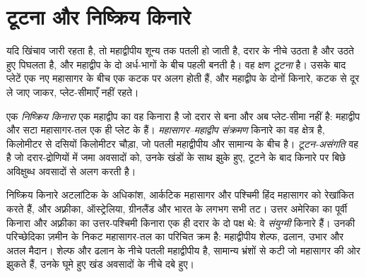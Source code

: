 \section{टूटना और निष्क्रिय किनारे}

यदि खिंचाव जारी रहता है, तो महाद्वीपीय  शून्य तक पतली हो जाती है, दरार के नीचे  उठता है और उठते हुए पिघलता है, और महाद्वीप के दो अर्ध-भागों के बीच पहली  बनती है। वह क्षण \emph{टूटना} है। उसके बाद प्लेटें एक नए महासागर के बीच एक कटक पर अलग होती हैं, और महाद्वीप के दोनों किनारे, कटक से दूर ले जाए जाकर, प्लेट-सीमाएँ नहीं रहते।

\begin{definition}[निष्क्रिय किनारा, महासागर–महाद्वीप संक्रमण, टूटन-असंगति]\label{def:b1:rifts-ridges-margins:passive-margin}
एक \emph{निष्क्रिय किनारा} एक महाद्वीप का वह किनारा है जो दरार से बना और अब प्लेट-सीमा नहीं है: महाद्वीप और सटा महासागर-तल एक ही प्लेट के हैं। \emph{महासागर–महाद्वीप संक्रमण} किनारे का वह क्षेत्र है, किलोमीटर से दसियों किलोमीटर चौड़ा, जो पतली महाद्वीपीय  और सामान्य  के बीच है। \emph{टूटन-असंगति} वह  है जो दरार-द्रोणियों में जमा अवसादों को, उनके खंडों के साथ झुके हुए, टूटने के बाद किनारे पर बिछे अविक्षुब्ध अवसादों से अलग करती है।
\end{definition}

निष्क्रिय किनारे अटलांटिक के अधिकांश, आर्कटिक महासागर और पश्चिमी हिंद महासागर को रेखांकित करते हैं, और अफ़्रीका, ऑस्ट्रेलिया, ग्रीनलैंड और भारत के लगभग सभी तट। उत्तर अमेरिका का पूर्वी किनारा और अफ़्रीका का उत्तर-पश्चिमी किनारा एक ही दरार के दो पक्ष थे: वे \emph{संयुग्मी} किनारे हैं। उनकी परिच्छेदिका ज़मीन के निकट महासागर-तल का परिचित क्रम है: महाद्वीपीय शेल्फ, ढलान, उभार और अतल मैदान। शेल्फ और ढलान के नीचे पतली महाद्वीपीय  है, सामान्य भ्रंशों से कटी जो महासागर की ओर झुकते हैं, उनके घूमे हुए खंड अवसादों के नीचे दबे हुए।

